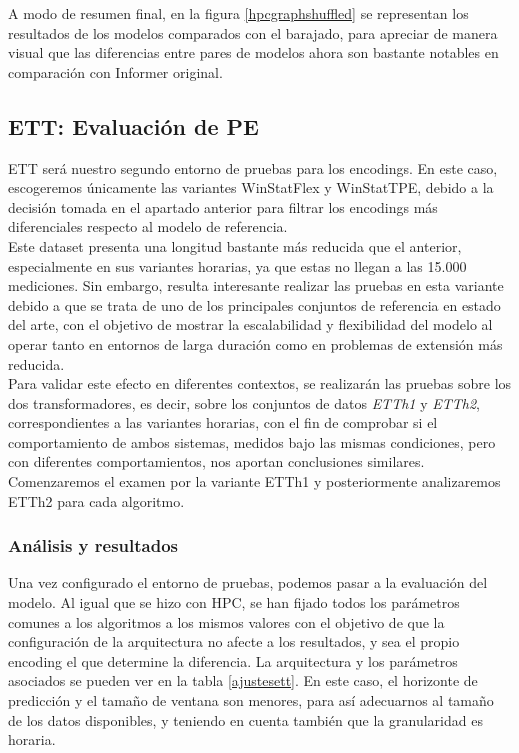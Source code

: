 A modo de resumen final, en la figura \ref{hpcgraphshuffled} se representan los resultados de los modelos comparados con el barajado, para apreciar de manera visual que las diferencias entre pares de modelos ahora son bastante notables en comparación con Informer original.


\subsection{ETT: Evaluación de PE}

ETT será nuestro segundo entorno de pruebas para los encodings. En este caso, escogeremos únicamente las variantes WinStatFlex y WinStatTPE, debido a la decisión tomada en el apartado anterior para filtrar los encodings más diferenciales respecto al modelo de referencia. \\

Este dataset presenta una longitud bastante más reducida que el anterior, especialmente en sus variantes horarias, ya que estas no llegan a las 15.000 mediciones. Sin embargo, resulta interesante realizar las pruebas en esta variante debido a que se trata de uno de los principales conjuntos de referencia en estado del arte, con el objetivo de mostrar la escalabilidad y flexibilidad del modelo al operar tanto en entornos de larga duración como en problemas de extensión más reducida.\\

 Para validar este efecto en diferentes contextos, se realizarán las pruebas sobre los dos transformadores, es decir, sobre los conjuntos de datos \textit{ETTh1} y \textit{ETTh2}, correspondientes a las variantes horarias, con el fin de comprobar si el comportamiento de ambos sistemas, medidos bajo las mismas condiciones, pero con diferentes comportamientos, nos aportan conclusiones similares. Comenzaremos el examen por la variante ETTh1 y posteriormente analizaremos ETTh2 para cada algoritmo.


\subsubsection{Análisis y resultados}

Una vez configurado el entorno de pruebas, podemos pasar a la evaluación del modelo. Al igual que se hizo con HPC, se han fijado todos los parámetros comunes a los algoritmos a los mismos valores con el objetivo de que la configuración de la arquitectura no afecte a los resultados, y sea el propio encoding el que determine la diferencia. La arquitectura y los parámetros asociados se pueden ver en la tabla \ref{ajustesett}. En este caso, el horizonte de predicción y el tamaño de ventana son menores, para así adecuarnos al tamaño de los datos disponibles, y teniendo en cuenta también que la granularidad es horaria.

